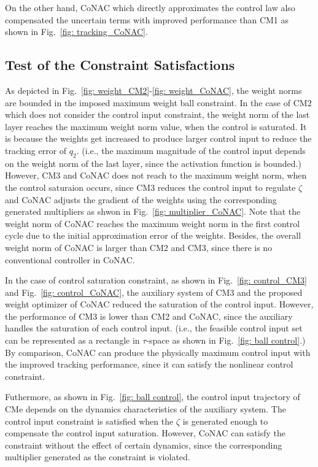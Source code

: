 \documentclass[lettersize,journal]{IEEEtran}
\begin{document}
On the other hand, CoNAC which directly approximates the control law also compensated the uncertain terms with improved performance than CM1 as shown in Fig.~\ref{fig: tracking_CoNAC}.

\subsection{Test of the Constraint Satisfactions}

As depicted in Fig.~\ref{fig: weight_CM2}-\ref{fig: weight_CoNAC}, the weight norms are bounded in the imposed maximum weight ball constraint.
In the case of CM2 which does not consider the control input constraint, the weight norm of the last layer reaches the maximum weight norm value, when the control is saturated.
It is because the weights get increased to produce larger control input to reduce the tracking error of $q_2$. (i.e., the maximum magnitude of the control input depends on the weight norm of the last layer, since the activation function is bounded.)
However, CM3 and CoNAC does not reach to the maximum weight norm, when the control saturaion occurs, since CM3 reduces the control input to regulate $\zeta$ and CoNAC adjusts the gradient of the weights using the corresponding generated multipliers as shwon in Fig.~\ref{fig: multiplier_CoNAC}.
Note that the weight norm of CoNAC reaches the maximum weight norm in the first control cycle due to the initial approximation error of the weights.
Besides, the overall weight norm of CoNAC is larger than CM2 and CM3, since there is no conventional controller in CoNAC.

In the case of control saturation constraint, as shown in Fig.~\ref{fig: control_CM3} and Fig.~\ref{fig: control_CoNAC}, the auxiliary system of CM3 and the proposed weight optimizer of CoNAC reduced the saturation of the control input.
However, the performance of CM3 is lower than CM2 and CoNAC, since the auxiliary handles the saturation of each control input. (i.e., the feasible control input set can be represented as a rectangle in $\tau$-space as shown in Fig.~\ref{fig: ball control}.)
By comparison, CoNAC can produce the physically maximum control input with the improved tracking performance, since it can satisfy the nonlinear control constraint. 

Futhermore, as shown in Fig.~\ref{fig: ball control}, the control input trajectory of CMe depends on the dynamics characteristics of the auxiliary system.
The control input constraint is satisfied when the $\zeta$ is generated enough to compensate the control input saturation.
However, CoNAC can satisfy the constraint without the effect of certain dynamics, since the corresponding multiplier generated as the constraint is violated.
\end{document}
